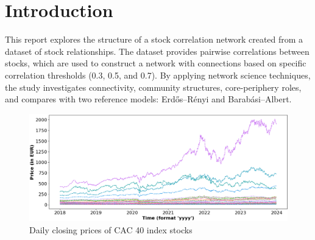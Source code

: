 \documentclass[12pt]{article}
\begin{document}
\section{Introduction}
This report explores the structure of a stock correlation network created from a dataset of stock relationships. The dataset provides pairwise correlations between stocks, which are used to construct a network with connections based on specific correlation thresholds (0.3, 0.5, and 0.7). By applying network science techniques, the study investigates connectivity, community structures, core-periphery roles, and compares with two reference models: Erdős–Rényi and Barabási–Albert.
\begin{figure}[h!]
  \centering
  \includegraphics[width=\textwidth]{close_price_index_cac40_stocks.png}
  \caption{Daily closing prices of CAC 40 index stocks}
  \label{fig:stock_close_price}
\end{figure}
\tableofcontents
\clearpage
\end{document}
